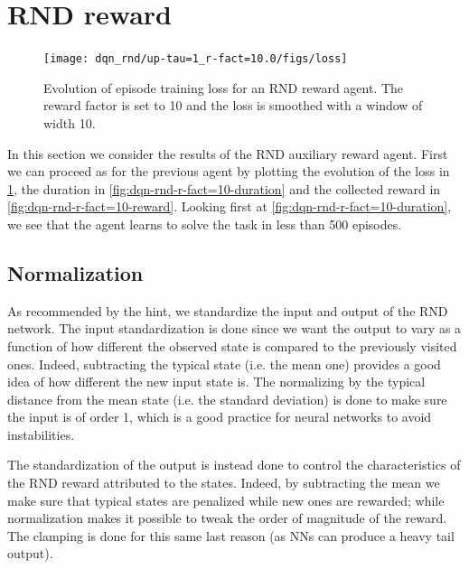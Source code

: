 \documentclass[a4paper, 12pt,oneside]{article}
\begin{document}
        \section{RND reward}
        \begin{figure}
            \centering
            \vspace{-2em}
            \texttt{[image: dqn\_rnd/up-tau=1\_r-fact=10.0/figs/loss]}
            \caption{Evolution of episode training loss for an RND reward agent. The reward factor is set to 10 and the loss is smoothed with a window of width 10.}
            \label{fig:dqn-rnd-r-fact=10-loss}
        \end{figure}
        In this section we consider the results of the RND auxiliary reward agent.
        First we can proceed as for the previous agent by plotting the evolution of the loss in \ref{fig:dqn-rnd-r-fact=10-loss}, the duration in \ref{fig:dqn-rnd-r-fact=10-duration} and the collected reward in \ref{fig:dqn-rnd-r-fact=10-reward}. Looking first at \ref{fig:dqn-rnd-r-fact=10-duration}, we see that the agent learns to  solve the task in less than 500 episodes. 
        \subsection{Normalization} 
        As recommended by the hint, we standardize the input and output of the RND network. The input standardization is done since we want the output to vary as a function of how different the observed state is compared to the previously visited ones. Indeed, subtracting the typical state (i.e. the mean one) provides a good idea of how different the new input state is.
        The normalizing by the typical distance from the mean state (i.e. the standard deviation) is done to make sure the input is of order 1, which is a good practice for neural networks to avoid instabilities.
        
        The standardization of the output is instead done to control the characteristics of the RND reward attributed to the states. Indeed, by subtracting the mean we make sure that typical states are penalized  while new ones are rewarded; while normalization makes it possible to tweak the order of magnitude of the reward. The clamping is done for this same last reason (as NNs can produce a heavy tail output). 
\end{document}
